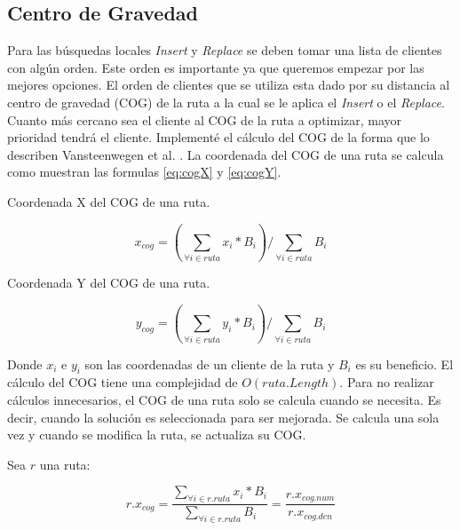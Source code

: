 \subsection{Centro de Gravedad}

Para las búsquedas locales \textit{Insert} y \textit{Replace} se deben tomar una lista de clientes con algún orden. Este orden es importante ya que queremos empezar por las mejores opciones. El orden de clientes que se utiliza esta dado por su distancia al centro de gravedad (COG) de la ruta a la cual se le aplica el \textit{Insert} o el \textit{Replace}. Cuanto más cercano sea el cliente al COG de la ruta a optimizar, mayor prioridad tendrá el cliente. Implementé el cálculo del COG de la forma que lo describen Vansteenwegen et al. \cite{VansteenwegenSouffriauBergheOudheusden}. La coordenada del COG de una ruta se calcula como muestran las formulas \ref{eq:cogX} y \ref{eq:cogY}.

\begin{mycapequ}[!ht]
	\caption{Coordenada X del COG de una ruta.}
	\begin{equation} \label{eq:cogX}
	x_{cog} = (\sum_{\forall i \in ruta} x_i * B_i) / \sum_{\forall i \in ruta} B_i
	\end{equation}
\end{mycapequ}

\begin{mycapequ}[!ht]
	\caption{Coordenada Y del COG de una ruta.}
	\begin{equation} \label{eq:cogY}
	y_{cog} = (\sum_{\forall i \in ruta} y_i * B_i) / \sum_{\forall i \in ruta} B_i
	\end{equation}
\end{mycapequ}

\bigskip

Donde $x_i$ e $y_i$ son las coordenadas de un cliente de la ruta y $B_i$ es su beneficio. El cálculo del COG tiene una complejidad de $O(ruta.Length)$. Para no realizar cálculos innecesarios, el COG de una ruta solo se calcula cuando se necesita. Es decir, cuando la solución es seleccionada para ser mejorada. Se calcula una sola vez y cuando se modifica la ruta, se actualiza su COG.

\bigskip

Sea $r$ una ruta:

\begin{equation} \label{eq:cogNumDen}
r.x_{cog} =  \frac{\sum_{\forall i \in r.ruta} x_i * B_i}{\sum_{\forall i \in r.ruta} B_i}  = \frac{r.x_{cog.num}}{r.x_{cog.den}}
\end{equation}

